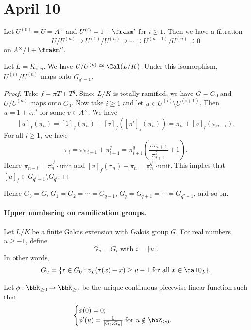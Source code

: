 \section{April 10}

  Let $U^(0) = U = A^\times$ and $U^{(i)} = 1 + \frakm^i$ for $i \geq 1$. Then we have a filtration
  \[ U/U^{(n)} \supseteq U^{(1)}/U^{(n)} \supseteq \cdots \supseteq U^{(n-1)}/U^{(n)} \supseteq 0 \]
  on $A^\times/1+\frakm^n$.
  
  \begin{proposition}
    Let $L = K_{\pi,n}$.
    \Yang{} We have $U/U^{(n)} \cong \Gal(L/K)$.
    Under this isomorphism, $U^{(i)}/U^{(n)}$ maps onto $G_{q^i-1}$.
  \end{proposition}
  \begin{proof}
    Take $f = \pi T + T^q$.
    Since $L/K$ is totally ramified, we have $G = G_0$ and $U/U^{(n)}$ maps onto $G_0$.
    Now take $i \geq 1$ and let $u \in U^{(i)} \setminus U^{(i+1)}$.
    Then $u = 1 + v \pi^i$ for some $v \in A^\times$.
    We have 
    \[ [u]_f (\pi_n) = [1]_f (\pi_n) + [v]_f ([\pi^i]_f (\pi_n)) = \pi_n + [v]_f (\pi_{n-i}). \]
    For all $i \geq 1$, we have 
    \[ \pi_i = \pi \pi_{i+1} + \pi_{i+1}^q = \pi_{i+1}^q \left( \frac{\pi \pi_{i+1}}{\pi_{i+1}^q} + 1 \right). \]
    Hence $\pi_{n-i} = \pi_n^{q^i} \cdot \text{unit}$ and $[u]_f(\pi_n) - \pi_n = \pi_n^{q^i} \cdot \text{unit}$.
    This implies that $[u]_f \in G_{q^i-1} \setminus G_{q^i}$.
  \end{proof}

  Hence $G_0 = G$, $G_1 = G_2 = \cdots = G_{q-1}$, $G_q = G_{q+1} = \cdots = G_{q^2-1}$, and so on.

  \paragraph{Upper numbering on ramification groups.}
  Let $L/K$ be a finite Galois extension with Galois group $G$.
  For real numbers $u \geq -1$, define
  \[ G_u = G_i \text{ with } i = \lceil u \rceil. \]
  In other words, 
  \[ G_u = \{ \tau \in G_0 : v_L(\tau(x) - x) \geq u + 1 \text{ for all } x \in \calO_L \}. \]

  \begin{definition}
    Let $\phi: \bbR_{\geq 0} \to \bbR_{\geq 0}$ be the unique continuous piecewise linear function such that 
    \[\begin{cases}
      \phi(0) = 0; \\
      \phi' (u) = \frac{1}{[G_0 : G_u]} \text{ for } u \notin \bbZ_{\geq 0}.
    \end{cases} \]
  \end{definition}

